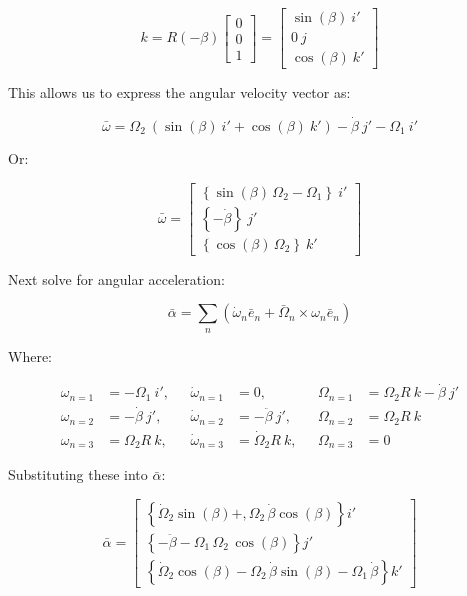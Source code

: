 \documentclass[12pt, letterpaper]{../assignment}
\begin{document}
$$ k = R(-\beta)  \left[\begin{array}{ccc} 0\\ 0\\ 1 \end{array}\right]
= \left[\begin{array}{r} \sin\left(\beta\right)\ i' \\ 0 \ j\\ \cos\left(\beta\right)\ k' \end{array}\right] $$

This allows us to express the angular velocity vector as:

$$ \bar{\omega} = \Omega_2\ \left( \sin(\beta) \ i' + \cos(\beta) \ k' \right)
                -\dot{\beta}\ j'
                - \Omega_1\ i' $$

Or:

$$ \bar{\omega} =
\left[\begin{array}{r}
    \left\{\sin\left(\beta\right)\,\Omega _{2}-\Omega _{1}\right\}\ i'\\
    \left\{-\dot{\beta}\right\}\ j'\\
    \left\{\cos\left(\beta\right)\,\Omega _{2}\right\}\ k'
\end{array}\right] $$


Next solve for angular acceleration:

$$ \bar{\alpha} =
\sum_n \left( \dot{\omega}_n \bar{e}_n + \bar{\Omega}_n \times \omega_n \bar{e}_n \right) $$

Where:

\begin{equation*}
\begin{aligned}
    \omega_{n=1} &= -\Omega_1\ i', \ \ \ &  \dot{\omega}_{n=1} &= 0, \ \ \ & \Omega_{n=1} &= \Omega_2 R\ k - \dot{\beta}\ j' \\
    \omega_{n=2} &= -\dot{\beta}\ j', \ \ \ & \dot{\omega}_{n=2} &= -\ddot{\beta}\ j', \ \ \ & \Omega_{n=2} &= \Omega_2 R\ k \\
    \omega_{n=3} &= \Omega_2 R\ k, \ \ \ &\dot{\omega}_{n=3} &= \dot{\Omega}_2 R\ k, \ \ \ & \Omega_{n=3} &= 0
\end{aligned}
\end{equation*}

Substituting these into $\bar{\alpha}$:

$$  \bar{\alpha} = 
\left[\begin{array}{r}
    \left\{\dot{\Omega}_{2}\sin\left(\beta \right)+,\Omega _{2}\,\dot{\beta} \cos\left(\beta \right) \right\} i' \\
    \left\{-\ddot{\beta} -\Omega _{1}\,\Omega _{2}\,\cos\left(\beta \right) \right\} j' \\
    \left\{\dot{\Omega} _{2}\cos\left(\beta \right) -\Omega _{2}\,\dot{\beta} \sin\left(\beta \right) -\Omega _{1}\,\dot{\beta} \right\} k '
\end{array}\right] $$
\end{document}
